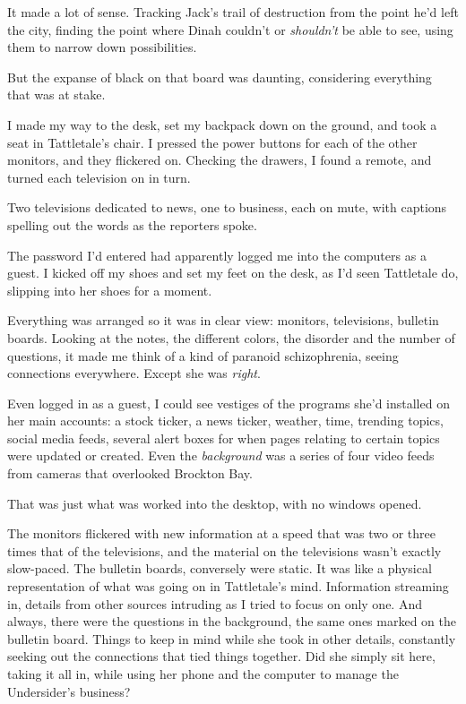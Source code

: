 It made a lot of sense.  Tracking Jack's trail of destruction from the point he'd left the city, finding the point where Dinah couldn't or \emph{shouldn't} be able to see, using them to narrow down possibilities.



But the expanse of black on that board was daunting, considering everything that was at stake.



I made my way to the desk, set my backpack down on the ground, and took a seat in Tattletale's chair.  I pressed the power buttons for each of the other monitors, and they flickered on.  Checking the drawers, I found a remote, and turned each television on in turn.



Two televisions dedicated to news, one to business, each on mute, with captions spelling out the words as the reporters spoke.



The password I'd entered had apparently logged me into the computers as a guest.  I kicked off my shoes and set my feet on the desk, as I'd seen Tattletale do, slipping into her shoes for a moment.



Everything was arranged so it was in clear view: monitors, televisions, bulletin boards.  Looking at the notes, the different colors, the disorder and the number of questions, it made me think of a kind of paranoid schizophrenia, seeing connections everywhere.  Except she was \emph{right}.



Even logged in as a guest, I could see vestiges of the programs she'd installed on her main accounts: a stock ticker, a news ticker, weather, time, trending topics, social media feeds, several alert boxes for when pages relating to certain topics were updated or created.  Even the \emph{background} was a series of four video feeds from cameras that overlooked Brockton Bay.



That was just what was worked into the desktop, with no windows opened.



The monitors flickered with new information at a speed that was two or three times that of the televisions, and the material on the televisions wasn't exactly slow-paced.  The bulletin boards, conversely were static.  It was like a physical representation of what was going on in Tattletale's mind.  Information streaming in, details from other sources intruding as I tried to focus on only one.  And always, there were the questions in the background, the same ones marked on the bulletin board.  Things to keep in mind while she took in other details, constantly seeking out the connections that tied things together.  Did she simply sit here, taking it all in, while using her phone and the computer to manage the Undersider's business?



